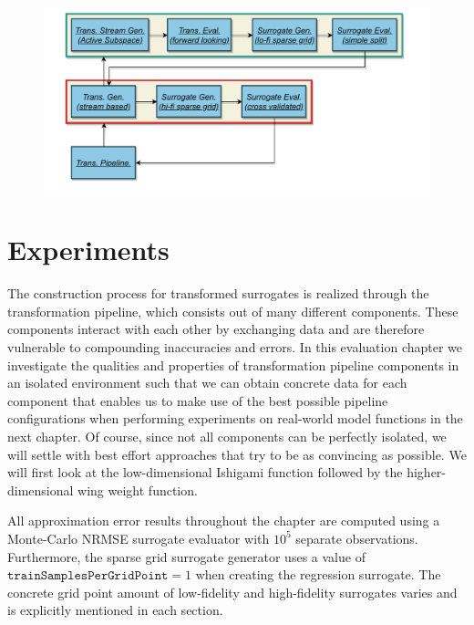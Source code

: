 \documentclass[
  a4paper,  %
  twoside,  %
  bibliography=totoc,
  headsepline,
  cleardoublepage=empty,
  parskip=half,
  draft=false
]{scrbook}
\begin{document}
\begin{mdframed}[style=style]
\begin{figure}[H]
\includegraphics[width=\textwidth]{graphics/PipelineExample.pdf}
\delimit

\label{fig:tpex}
\end{figure}
\end{mdframed}

\chapter{Experiments}
\label{chap:c7}

The construction process for transformed surrogates is realized through the transformation pipeline, which consists out of many different components.
These components interact with each other by exchanging data and are therefore vulnerable to compounding inaccuracies and errors.
In this evaluation chapter we investigate the qualities and properties of transformation pipeline components in an isolated environment such that we can obtain concrete data for each component that enables us to make use of the best possible pipeline configurations when performing experiments on real-world model functions in the next chapter.
Of course, since not all components can be perfectly isolated, we will settle with best effort approaches that try to be as convincing as possible.
We will first look at the low-dimensional Ishigami function followed by the higher-dimensional wing weight function.

All approximation error results throughout the chapter are computed using a Monte-Carlo NRMSE surrogate evaluator with $10^5$ separate observations.
Furthermore, the sparse grid surrogate generator uses a value of $\texttt{trainSamplesPerGridPoint}=1$ when creating the regression surrogate.
The concrete grid point amount of low-fidelity and high-fidelity surrogates varies and is explicitly mentioned in each section.
\end{document}
